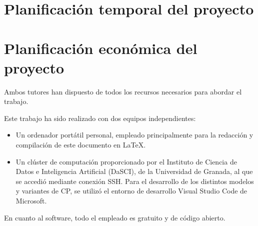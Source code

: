 
\section{Planificación temporal del proyecto}




\section{Planificación económica del proyecto}

Ambos tutores han dispuesto de todos los recursos necesarios para abordar el trabajo. 

Este trabajo ha sido realizado con dos equipos independientes: 

\begin{itemize}

    \item Un ordenador portátil personal, empleado principalmente para la redacción y compilación de este 
    documento en \LaTeX.
        
    \item Un clúster de computación proporcionado por el Instituto de Ciencia de Datos e Inteligencia 
    Artificial (DaSCI), de la Universidad de Granada, al que se accedió mediante conexión SSH. Para el 
    desarrollo de los distintos modelos y variantes de CP, se utilizó el entorno de desarrollo Visual Studio 
    Code de Microsoft.

\end{itemize}


En cuanto al software, todo el empleado es gratuito y de código abierto. 




